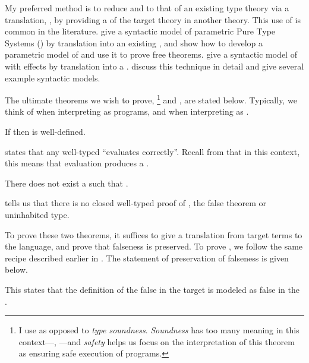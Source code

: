 My preferred method is to reduce  and  to
that of an existing type theory via a  translation, \ie,
by providing a  of the target theory in another theory.
This use of  is common in the literature.
\citet{bernardy2012} give a syntactic model of parametric Pure Type Systems
() by translation into an existing , and show how to
develop a parametric model of  and use it to prove free theorems.
\citet{pedrot2017:weaning} give a syntactic model of  with effects by
translation into a .
\citet{boulier2017} discuss this technique in detail and give several example
syntactic models.

The ultimate theorems we wish to prove, \footnote{I use
   as opposed to \emph{type soundness}. \emph{Soundness}
  has too many meaning in this context---\eg, ---and \emph{safety} helps us focus on the
  interpretation of this theorem as ensuring safe execution of programs.} and
, are stated below.
Typically, we think of  when interpreting 
as programs, and  when interpreting  as .
\begin{theorem}
  If \im{\twf{\te}} then \im{\teval{\te}} is well-defined.
\end{theorem}
 states that any
well-typed  ``evaluates correctly''.
Recall from  that in this context, this means that
evaluation produces a .
\begin{theorem}
  There does not exist a \im{\te} such that \im{\ttyjudg{\cdot}{\te}{\tFalse}}.
\end{theorem}
 tells us that there is no closed well-typed
proof of \im{\tFalse}, the false theorem or uninhabited type.

To prove these two theorems, it suffices to give a 
translation \im{\model{\te}} from target terms to the  language, and
prove that falseness is preserved.
To prove , we follow the same 
recipe described earlier in .
The statement of preservation of falseness is given below.
\begin{lemma}
  \im{\model{\tFalse} \equiv \sFalse}
\end{lemma}
\noindent This states that the definition of the false in the target is modeled
as false in the .

